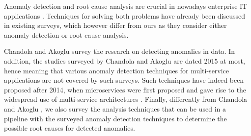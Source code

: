 Anomaly detection and root cause analysis are crucial in nowadays enterprise IT applications \cite{16_Liu2020_TraceAnomaly,29_Wang2018_CloudRanger}.
Techniques for solving both problems have already been discussed in existing surveys, which however differ from ours as they consider either anomaly detection or root cause analysis.

Chandola \etal \cite{Chandola2009_SurveyAnomalyDetection} and Akoglu \etal \cite{Akoglu2015_GraphBasedAnomalyDetection} survey the research on detecting anomalies in data.
In addition, the studies surveyed by Chandola \etal \cite{Chandola2009_SurveyAnomalyDetection} and Akoglu \etal \cite{Akoglu2015_GraphBasedAnomalyDetection} are dated 2015 at most, hence meaning that various anomaly detection techniques for multi-service applications are not covered by such surveys.
Such techniques have indeed been proposed after 2014, when microservices were first proposed \cite{Lewis2014_Microservices} and gave rise to the widespread use of multi-service architectures \cite{Soldani2018_MicroservicesPainsGains}.
Finally, differently from Chandola \etal \cite{Chandola2009_SurveyAnomalyDetection} and Akoglu \etal \cite{Akoglu2015_GraphBasedAnomalyDetection}, we also survey the analysis techniques that can be used in a pipeline with the surveyed anomaly detection techniques to determine the possible root causes for detected anomalies.

